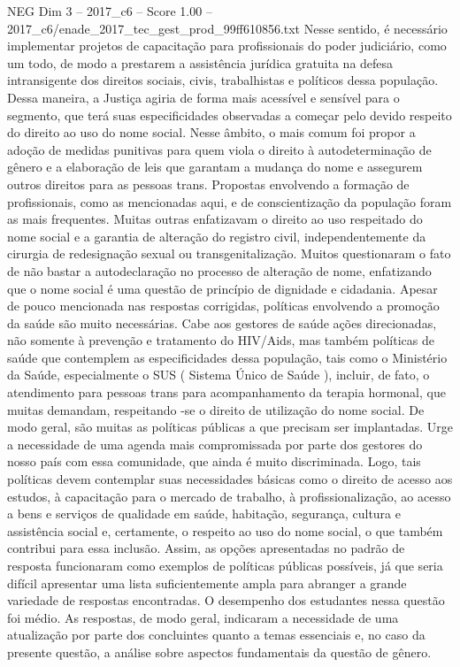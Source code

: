 \begin{textsample}{NEG Dim 3 – 2017\_c6 – Score 1.00 – 2017\_c6/enade\_2017\_tec\_gest\_prod\_99ff610856.txt}
Nesse sentido, é necessário implementar projetos de capacitação para profissionais do poder judiciário, como um todo, de modo a prestarem a assistência jurídica gratuita na defesa intransigente dos direitos sociais, civis, trabalhistas e políticos dessa população.
Dessa maneira, a Justiça agiria de forma mais acessível e sensível para o segmento, que terá suas especificidades observadas a começar pelo devido respeito do direito ao uso do nome social.
Nesse âmbito, o mais comum foi propor a adoção de medidas punitivas para quem viola o direito à autodeterminação de gênero e a elaboração de leis que garantam a mudança do nome e assegurem outros direitos para as pessoas trans.
Propostas envolvendo a formação de profissionais, como as mencionadas aqui, e de conscientização da população foram as mais frequentes.
Muitas outras enfatizavam o direito ao uso respeitado do nome social e a garantia de alteração do registro civil, independentemente da cirurgia de redesignação sexual ou transgenitalização.
Muitos questionaram o fato de não bastar a autodeclaração no processo de alteração de nome, enfatizando que o nome social é uma questão de princípio de dignidade e cidadania.
Apesar de pouco mencionada nas respostas corrigidas, políticas envolvendo a promoção da saúde são muito necessárias.
Cabe aos gestores de saúde ações direcionadas, não somente à prevenção e tratamento do HIV/Aids, mas também políticas de saúde que contemplem as especificidades dessa população, tais como o Ministério da Saúde, especialmente o SUS ( Sistema Único de Saúde ), incluir, de fato, o atendimento para pessoas trans para acompanhamento da terapia hormonal, que muitas demandam, respeitando -se o direito de utilização do nome social.
De modo geral, são muitas as políticas públicas a que precisam ser implantadas.
Urge a necessidade de uma agenda mais compromissada por parte dos gestores do nosso país com essa comunidade, que ainda é muito discriminada.
Logo, tais políticas devem contemplar suas necessidades básicas como o direito de acesso aos estudos, à capacitação para o mercado de trabalho, à profissionalização, ao acesso a bens e serviços de qualidade em saúde, habitação, segurança, cultura e assistência social e, certamente, o respeito ao uso do nome social, o que também contribui para essa inclusão.
Assim, as opções apresentadas no padrão de resposta funcionaram como exemplos de políticas públicas possíveis, já que seria difícil apresentar uma lista suficientemente ampla para abranger a grande variedade de respostas encontradas.
O desempenho dos estudantes nessa questão foi médio.
As respostas, de modo geral, indicaram a necessidade de uma atualização por parte dos concluintes quanto a temas essenciais e, no caso da presente questão, a análise sobre aspectos fundamentais da questão de gênero.

\end{textsample}
